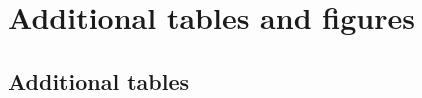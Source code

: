 
\chapter{Additional tables and figures}
\label{cha:add-tf}


\ifpdf
    \graphicspath{{9_backmatter/figures/PNG/}{9_backmatter/figures/PDF/}{9_backmatter/figures/}}
\else
    \graphicspath{{9_backmatter/figures/EPS/}{9_backmatter/figures/}}
\fi

\section{Additional tables}
\label{add-table}

